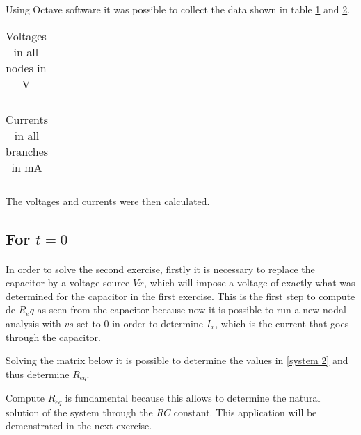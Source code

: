 Using Octave software it was possible to collect the data shown in table \ref{table1a} and \ref{table1b}.

\begin{table}[H]
    \centering
    \begin{tabular}{|c|c|}
    \hline
        
    \end{tabular}
    \caption{Voltages in all nodes in V}
    \label{table1a}
\end{table}

\begin{table}[H]
    \centering
    \begin{tabular}{|c|c|}
    \hline
        
    \end{tabular}
    \caption{Currents in all branches in mA}
    \label{table1b}
\end{table}

The voltages and currents were then calculated. 

\subsection{For $t=0$}
\paragraph{}

\par In order to solve the second exercise, firstly it is necessary to replace the capacitor by a voltage source $Vx$, which will impose a voltage of exactly what was determined for the capacitor in the first exercise. This is the first step to compute de $R_eq$ as seen from the capacitor because now it is possible to run a new nodal analysis with $vs$ set to 0 in order to determine $I_x$, which is the current that goes through the capacitor.
\par Solving the matrix below it is possible to determine the values in \ref{system 2} and thus determine $R_{eq}$.

\par Compute $R_{eq}$ is fundamental because this allows to determine the natural solution of the system through the $RC$ constant. This application will be demenstrated in the next exercise.

